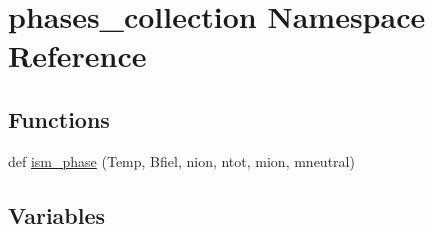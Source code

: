 \hypertarget{namespacephases__collection}{}\section{phases\+\_\+collection Namespace Reference}
\label{namespacephases__collection}
\subsection*{Functions}
\begin{DoxyCompactItemize}
\item 
def \hyperlink{namespacephases__collection_aae55a1d8374bfc3868cd04555c049676}{ism\+\_\+phase} (Temp, Bfiel, nion, ntot, mion, mneutral)
\end{DoxyCompactItemize}
\subsection*{Variables}
